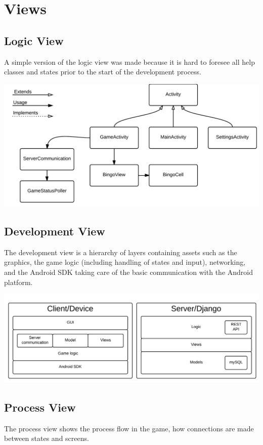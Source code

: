 \section{Views}
\label{sec:views}

\subsection{Logic View}
A simple version of the logic view was made because it is hard to foresee all
help classes and states prior to the start of the development process.
\begin{center}
\includegraphics[clip=true, width=0.9 \textwidth]{Pikks/LogicViewFinal.png}
\label{ref:gantt}
\end{center}

\subsection{Development View}
The development view is a hierarchy of layers containing assets such as the
graphics, the game logic (including handling of states and input), networking,
and the Android SDK taking care of the basic communication with the Android platform.
\begin{center}
\includegraphics[clip=true, width=0.9 \textwidth]{Pikks/DevelopmentViewFinal.png}
\label{ref:gantt}
\end{center}

\subsection{Process View}
The process view shows the process flow in the game, how connections are made
between states and screens.

